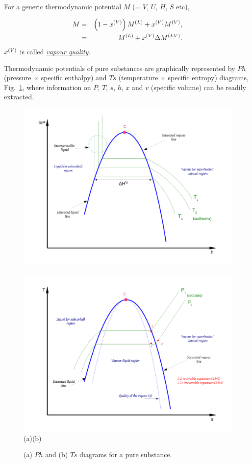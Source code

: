 For a generic thermodynamic potential $M$ (= $V$, $U$, $H$, $S$ etc),
    \begin{shaded}
           \begin{eqnarray}
              M &=& \left(1-\mfr[x]{}{V}\right)\mfr[M]{}{L} + \mfr[x]{}{V}\mfr[M]{}{V}, \nonumber \\
                &=& \mfr[M]{}{L} + \mfr[x]{}{V}\Delta\mfr[M]{}{LV}.\label{Chapter:ThermodynamicPropertiesPureFluids:Eqn:QualityVapour}
           \end{eqnarray}
           $\mfr[x]{}{V}$ is called \underline{\it vapour quality}.
    \end{shaded}
Thermodynamic potentials of pure substances are graphically represented by $Ph$ (pressure $\times$ specific enthalpy) and $Ts$ (temperature $\times$ specific entropy) diagrams, Fig.~\ref{Chapter:ThermodynamicPropertiesPureFluids:Fig:Fig02}, where information on $P$, $T$, $s$, $h$, $x$ and $v$ (specific volume) can be readily extracted.
%
           \begin{figure}[h]
              \vbox{
                    \hbox{\includegraphics[width=.5\columnwidth,clip]{./Figs/Mod3PHDiagram}
                          \includegraphics[width=.5\columnwidth,clip]{./Figs/Mod3TSDiagram}}
                    \vspace{-.1cm}
                    \hbox{\hspace{4cm}(a)\hspace{8cm}(b)}}
              \caption{ (a) $Ph$ and (b) $Ts$ diagrams for a pure substance.}\label{Chapter:ThermodynamicPropertiesPureFluids:Fig:Fig02}
           \end{figure}
%

